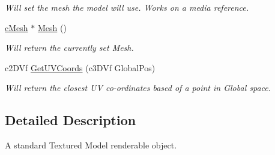 \begin{DoxyCompactItemize}
\begin{DoxyCompactList}\small\item\em Will set the mesh the model will use. Works on a media reference. \end{DoxyCompactList}\item 
\hypertarget{classc_model_ac742f3b754cb8a5634e104529c5e5c55}{
\hyperlink{classc_mesh}{cMesh} $\ast$ \hyperlink{classc_model_ac742f3b754cb8a5634e104529c5e5c55}{Mesh} ()}
\label{classc_model_ac742f3b754cb8a5634e104529c5e5c55}

\begin{DoxyCompactList}\small\item\em Will return the currently set Mesh. \end{DoxyCompactList}\item 
\hypertarget{classc_model_a59f9f54cb72171c93da74cefe008ea2e}{
c2DVf \hyperlink{classc_model_a59f9f54cb72171c93da74cefe008ea2e}{GetUVCoords} (c3DVf GlobalPos)}
\label{classc_model_a59f9f54cb72171c93da74cefe008ea2e}

\begin{DoxyCompactList}\small\item\em Will return the closest UV co-\/ordinates based of a point in Global space. \end{DoxyCompactList}\end{DoxyCompactItemize}


\subsection{Detailed Description}
A standard Textured Model renderable object. 